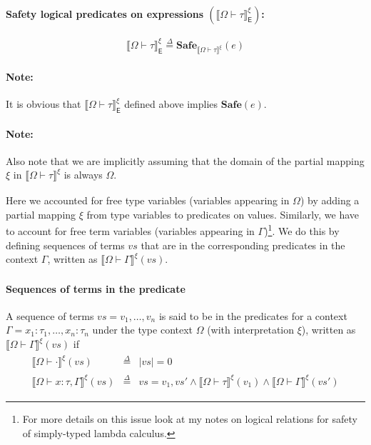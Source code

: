 \documentclass{article}
\newcommand{\EXP}{\mathsf{E}}
\newcommand{\defeq}{\overset{\Delta}{=}}
\newcommand{\semtyp}[2]{\llbracket #2 \rrbracket_{#1}}
\begin{document}
\paragraph{Safety logical predicates on expressions $\left(\semtyp{\EXP}{\Omega \vdash \tau}^{\xi}\right)$:}
\[
\semtyp{\EXP}{\Omega \vdash \tau}^{\xi} \defeq \mathbf{Safe}_{\semtyp{}{\Omega \vdash \tau}^{\xi}}(e)
\]

\paragraph{Note:} It is obvious that $\semtyp{\EXP}{\Omega \vdash \tau}^{\xi}$
defined above implies $\mathbf{Safe}(e)$.
\paragraph{Note:} Also note that we are implicitly assuming that the domain of
the partial mapping $\xi$ in $\semtyp{}{\Omega \vdash \tau}^{\xi}$ is always $\Omega$.

Here we accounted for free type variables (variables appearing
in $\Omega$) by adding a partial
mapping $\xi$ from type variables to predicates on values.
Similarly, we have to account for free term variables (variables
appearing in $\Gamma$)\footnote{For more details on this
issue look at my notes on logical relations for safety of
simply-typed lambda calculus.}.
We do this by defining sequences of terms $\mathit{vs}$
that are in the corresponding predicates in the context
$\Gamma$, written as $\semtyp{}{\Omega \vdash \Gamma}^{\xi}(\mathit{vs})$.

\paragraph{Sequences of terms in the predicate}
A sequence of terms $\mathit{vs} = v_1, \dots,v_n$ is said to be in the predicates for a context
$\Gamma = x_1 : \tau_1,\dots, x_n : \tau_n$ under the type
context $\Omega$ (with interpretation $\xi$), written as $\semtyp{}{\Omega \vdash \Gamma}^{\xi}(vs)$ if
\[
\begin{array}{lll}
\semtyp{}{\Omega \vdash \cdot}^{\xi}(\mathit{vs}) &\defeq&
|\mathit{vs}| = 0\\
\semtyp{}{\Omega \vdash x : \tau, \Gamma}^{\xi}(\mathit{vs})
&\defeq& vs = v_1, \mathit{vs'} \land
\semtyp{}{\Omega \vdash \tau}^{\xi}(v_1) \land
\semtyp{}{\Omega \vdash \Gamma}^{\xi}(\mathit{vs'})
\end{array}
\]
\end{document}
